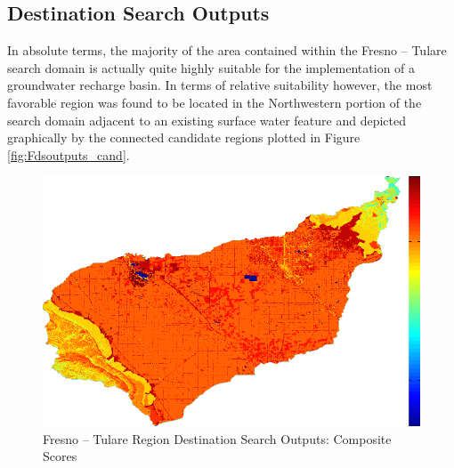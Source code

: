     \subsection{Destination Search Outputs}
    
In absolute terms, the majority of the area contained within the Fresno -- Tulare search domain is actually quite highly suitable for the implementation of a groundwater recharge basin. In terms of relative suitability however, the most favorable region was found to be located in the Northwestern portion of the search domain adjacent to an existing surface water feature and depicted graphically by the connected candidate regions plotted in Figure \ref{fig:Fdsoutputs_cand}. 
    
        \begin{figure}[!h]
            \begin{center}
            \includegraphics[width=5.5in]{figures/Fresno_Search_Composite.png}   
            \caption{Fresno -- Tulare Region Destination Search Outputs: Composite Scores}
            \label{fig:Fdsoutputs_comp}
            \end{center}
        \end{figure}
        
